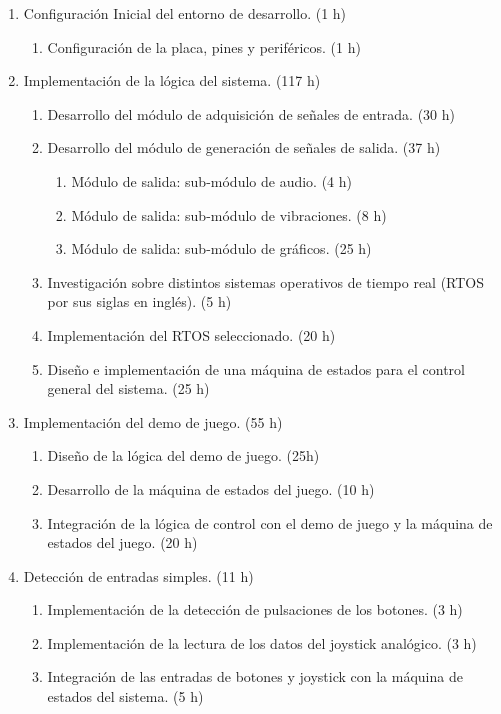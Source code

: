 \documentclass[
11pt, %
]{charter}
\begin{document}
\begin{enumerate}
\begin{enumerate}
	\item	Configuración Inicial del entorno de desarrollo. (1 h)
	\begin{enumerate}	
	\item	Configuración de la placa, pines y periféricos. (1 h)
	\end{enumerate}	
	\item	Implementación de la lógica del sistema. (117 h)
	\begin{enumerate}	
	\item	Desarrollo del módulo de adquisición de señales de entrada. (30 h)
	\item	Desarrollo del módulo de generación de señales de salida. (37 h)
	\begin{enumerate}	
	\item	Módulo de salida: sub-módulo de audio. (4 h)
	\item	Módulo de salida: sub-módulo de vibraciones. (8 h)
	\item	Módulo de salida: sub-módulo de gráficos. (25 h)
	\end{enumerate}	
	\item	Investigación sobre distintos sistemas operativos de tiempo real (RTOS por sus siglas en inglés). (5 h)
	\item	Implementación del RTOS seleccionado. (20 h)
	\item	Diseño e implementación de una máquina de estados para el control general del sistema. (25 h)
	\end{enumerate}	
	\item	Implementación del demo de juego. (55 h)
	\begin{enumerate}	
	\item	Diseño de la lógica del demo de juego. (25h)
	\item	Desarrollo de la máquina de estados del juego. (10 h)
	\item	Integración de la lógica de control con el demo de juego y la máquina de estados del juego. (20 h)
	\end{enumerate}	
	\item	Detección de entradas simples. (11 h)
	\begin{enumerate}	
	\item	Implementación de la detección de pulsaciones de los botones. (3 h)
	\item	Implementación de la lectura de los datos del joystick analógico. (3 h)
	\item	Integración de las entradas de botones y joystick con la máquina de estados del sistema. (5 h)

\end{enumerate}
\end{enumerate}
\end{enumerate}
\end{document}
